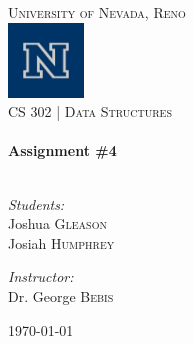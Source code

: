 \begin{titlepage}
	\begin{center}

		\textsc{\LARGE University of Nevada, Reno}\\[.5cm]
		\includegraphics[width=0.15\textwidth]{./logo.png}\\[.5cm]

		\textsc{\large CS 302 | Data Structures } \\[.5cm]

		\HRule \\[0.4cm]
		{ \huge \bfseries Assignment \#4}\\[0.4cm]

		\HRule \\[1.5cm]

		\begin{minipage}{0.4\textwidth}
			\begin{flushleft} \large
				\emph{Students:}\\
				Joshua \textsc{Gleason}\\
				Josiah \textsc{Humphrey}
			\end{flushleft}
		\end{minipage}
		\begin{minipage}{0.4\textwidth}
			\begin{flushright} \large
				\emph{Instructor:} \\
				Dr. George \textsc{Bebis}
			\end{flushright}
		\end{minipage}

		\vfill

		{\large \today}

	\end{center}

\end{titlepage}
